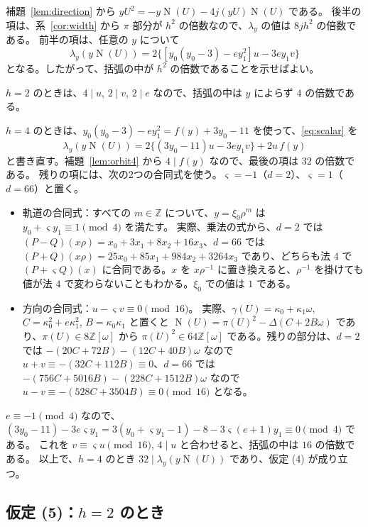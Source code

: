 \documentclass[a4paper,11pt]{ltjsarticle}
\theoremstyle{jplain}
\numberwithin{equation}{section}
\numberwithin{table}{section}
\newcommand{\Z}{\mathbb{Z}}
\newcommand{\Nm}{\operatorname{N}}
\newcommand{\tsec}[2]{\texorpdfstring{#1}{#2}}
\begin{document}
補題~\ref{lem:direction} から $yU^2=-y\Nm(U)-4j(yU)\Nm(U)$ である。
後半の項は、系~\ref{cor:width} から $\pi$ 部分が $h^2$ の倍数なので、$\lambda_y$ の値は $8jh^2$ の倍数である。
前半の項は、任意の $y$ について
\begin{equation}\label{eq:scalar}
\lambda_y(y\Nm(U))=2\bigl\{[y_0(y_0-3)-ey_1^2]u-3ey_1v\bigr\}
\end{equation}
となる。したがって、括弧の中が $h^2$ の倍数であることを示せばよい。

$h=2$ のときは、$4\mid u$, $2\mid v$, $2\mid e$ なので、括弧の中は $y$ によらず $4$ の倍数である。

$h=4$ のときは、$y_0(y_0-3)-ey_1^2=f(y)+3y_0-11$ を使って、\eqref{eq:scalar} を
\[
\lambda_y(y\Nm(U))=2\bigl\{(3y_0-11)u-3ey_1v\bigr\}+2u\,f(y)
\]
と書き直す。補題~\ref{lem:orbit4} から $4\mid f(y)$ なので、最後の項は $32$ の倍数である。
残りの項には、次の2つの合同式を使う。$\varsigma=-1$（$d=2$）、$\varsigma=1$（$d=66$）と置く。
\begin{itemize}
\item 軌道の合同式：すべての $m\in\Z$ について、$y=\xi_0\rho^m$ は $y_0+\varsigma y_1\equiv1\pmod4$ を満たす。
実際、乗法の式から、$d=2$ では $(P-Q)(x\rho)=x_0+3x_1+8x_2+16x_3$、$d=66$ では $(P+Q)(x\rho)=25x_0+85x_1+984x_2+3264x_3$ であり、どちらも法 $4$ で $(P+\varsigma Q)(x)$ に合同である。$x$ を $x\rho^{-1}$ に置き換えると、$\rho^{-1}$ を掛けても値が法 $4$ で変わらないこともわかる。$\xi_0$ での値は $1$ である。
\item 方向の合同式：$u-\varsigma v\equiv0\pmod{16}$。
実際、$\gamma(U)=\kappa_0+\kappa_1\omega$, $C=\kappa_0^2+e\kappa_1^2$, $B=\kappa_0\kappa_1$ と置くと $\Nm(U)=\pi(U)^2-\Delta(C+2B\omega)$ であり、$\pi(U)\in8\Z[\omega]$ から $\pi(U)^2\in64\Z[\omega]$ である。残りの部分は、$d=2$ では $-(20C+72B)-(12C+40B)\omega$ なので $u+v\equiv-(32C+112B)\equiv0$、$d=66$ では $-(756C+5016B)-(228C+1512B)\omega$ なので $u-v\equiv-(528C+3504B)\equiv0\pmod{16}$ となる。
\end{itemize}
$e\equiv-1\pmod4$ なので、$(3y_0-11)-3e\varsigma y_1=3(y_0+\varsigma y_1-1)-8-3\varsigma(e+1)y_1\equiv0\pmod4$ である。
これを $v\equiv\varsigma u\pmod{16}$, $4\mid u$ と合わせると、括弧の中は $16$ の倍数である。
以上で、$h=4$ のとき $32\mid\lambda_y(y\Nm(U))$ であり、仮定 (4) が成り立つ。

\subsection{仮定 (5)：\tsec{$h=2$}{h=2} のとき}\label{sec:hyp5a}
\end{document}
